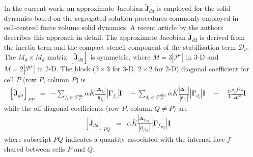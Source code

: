 \documentclass[sn-mathphys,Numbered]{sn-jnl}%
\newcommand{\bb}{\boldsymbol}
\begin{document}
In the current work, an approximate Jacobian $\tilde{\bb{J}}_{dd}$ is employed for the solid dynamics based on the segregated solution procedures commonly employed in cell-centred finite volume solid dynamics.
A recent article \citep{Cardiff2025jfnk} by the authors describes this approach in detail.
The approximate Jacobian $\tilde{\bb{J}}_{dd}$ is derived from the inertia term and the compact stencil component of the stabilisation term $\bb{\mathcal{D}}_d$.
The $M_d \times M_d$ matrix $\left[ \bb{\tilde{J}}_{dd} \right]$ is symmetric, where $M = 3|\mathcal{P}^s|$ in 3-D and $M = 2|\mathcal{P}^s|$ in 2-D.
The block ($3\times3$ for 3-D, $2\times2$ for 2-D) diagonal coefficient for cell $P$ (row $P$, column $P$) is
\begin{eqnarray}
	 \left[ \tilde{\bb{J}}_{dd} \right]_{PP} &=&
		- \sum_{f_i \in \mathcal{F}^{\text{int}}_P}  \alpha \bar{K}
		\frac{ \left|\bb{\Delta}_{f_i} \right| }{\left|\bb{\delta}_{f_i}\right|}    \left|\bb{\Gamma}_{f_i}\right| \textbf{I} 
	    \quad-  \sum_{d_i \in \mathcal{F}^{\text{disp}}_P}  \alpha \bar{K}
		 \frac{ \left|\bb{\Delta}_{d_i} \right| }{\left|\bb{\delta}_{d_i}\right|} 
		\left|\bb{\Gamma}_{d_i}\right| \textbf{I} %
	\quad- \quad \frac{9}{4}  \frac{\rho_P \Omega_P}{\Delta t^2} \textbf{I}
\end{eqnarray}
while the off-diagonal coefficients (row $P$, column $Q \neq P$) are
\begin{eqnarray}
	\left[\tilde{\bb{J}}_{dd} \right] _{PQ} &=&
		\alpha \bar{K} \frac{ \left|\bb{\Delta}_{f_{PQ}} \right| }{\left|\bb{d}_{f_{PQ}}\right|} \left|\bb{\Gamma}_{f_{PQ}}\right| \textbf{I} 
\end{eqnarray}
where subscript $PQ$ indicates a quantity associated with the internal face $f$ shared between cells $P$ and $Q$.
\end{document}
